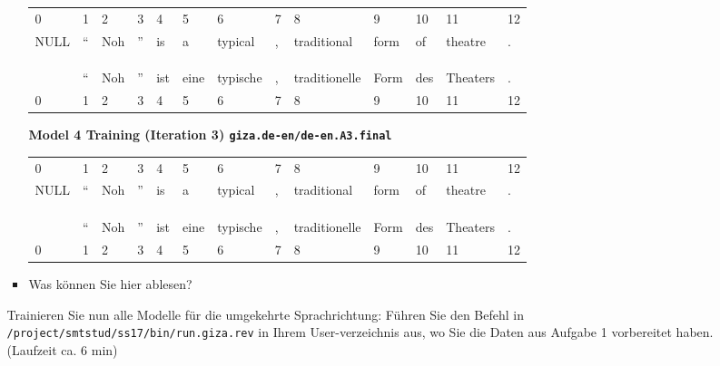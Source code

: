 \documentclass[12pt,fleqn]{article}
\begin{document}
\begin{enumerate}
\begin{enumerate}
\begin{itemize}
 \begin{table}[h] 
 \begin{center} 
\begin{tabular}{lllllllllllll} 
0 & 1&2&3&4&5&6&7&8&9&10&11&12 \\ 
NULL & `` & Noh & '' & is & a&typical&,&traditional&form&of&theatre&. \\  
&&&&&&&&&&&& \\ 
&&&&&&&&&&&& \\ 
&&&&&&&&&&&& \\ 
& `` & Noh & '' & ist & eine & typische&,&traditionelle & Form&des&Theaters& . \\ 
0 & 1&2&3&4&5&6&7&8&9&10&11&12 \\ 
\end{tabular}
 \end{center}
\end{table}

 \vspace{0.5cm}
 \textbf{Model 4 Training (Iteration 3) \texttt{giza.de-en/de-en.A3.final}} \\ 
 
 
 \begin{table}[h] 
 \begin{center} 
\begin{tabular}{lllllllllllll} 
0 & 1&2&3&4&5&6&7&8&9&10&11&12 \\ 
NULL & `` & Noh & '' & is & a&typical&,&traditional&form&of&theatre&. \\  
&&&&&&&&&&&& \\ 
&&&&&&&&&&&& \\ 
&&&&&&&&&&&& \\ 
& `` & Noh & '' & ist & eine & typische&,&traditionelle & Form&des&Theaters& . \\ 
0 & 1&2&3&4&5&6&7&8&9&10&11&12 \\ 
\end{tabular}
 \end{center}
\end{table}

 \item Was können Sie hier ablesen?
\end{itemize}

\vspace{0.5cm} 
Trainieren Sie nun alle Modelle für die umgekehrte Sprachrichtung:
Führen Sie den Befehl in \texttt{/project/smtstud/ss17/bin/run.giza.rev} in Ihrem User-verzeichnis aus, wo Sie die Daten aus Aufgabe 1 vorbereitet haben. (Laufzeit ca. 6 min)


\end{enumerate}
\end{enumerate}
\end{document}
